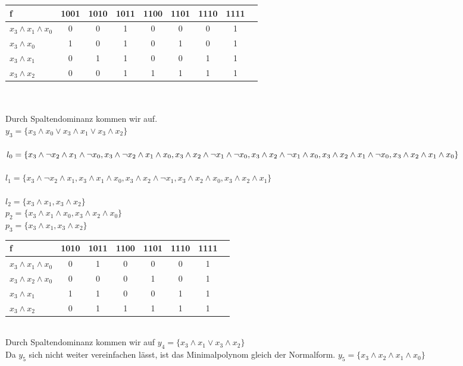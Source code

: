 \documentclass[11pt,a4paper]{article}
\begin{document}
\begin{tabular}{l  | c | c | c | c | c | c | c | c }
f&1001&1010&1011&1100&1101&1110&1111 \\ \hline
$x_3 \wedge x_1 \wedge x_0$&0&0&1&0&0&0&1\\
$x_3 \wedge x_0$&1&0&1&0&1&0&1\\
$x_3 \wedge x_1$&0&1&1&0&0&1&1\\
$x_3 \wedge x_2$&0&0&1&1&1&1&1\\
\end{tabular}\\ \\
Durch Spaltendominanz kommen wir auf.\\
$y_3=\lbrace x_3 \wedge x_0 \vee x_3 \wedge x_1 \vee x_3 \wedge x_2 \rbrace$\\ \\
$l_0= \lbrace \\
x_3 \wedge \neg x_2 \wedge x_1 \wedge \neg x_0, \\
x_3 \wedge \neg x_2 \wedge x_1 \wedge x_0, \\
x_3 \wedge x_2 \wedge \neg x_1 \wedge \neg x_0,\\
x_3 \wedge x_2 \wedge \neg x_1 \wedge x_0,\\
x_3 \wedge x_2 \wedge x_1 \wedge \neg x_0, \\
x_3 \wedge x_2 \wedge x_1 \wedge x_0 \rbrace$\\ \\
$l_1= \lbrace 
x_3 \wedge \neg x_2 \wedge x_1,
x_3 \wedge x_1 \wedge x_0,
x_3 \wedge x_2 \wedge \neg x_1,
x_3 \wedge x_2 \wedge x_0,
x_3 \wedge x_2 \wedge x_1 \rbrace$\\ \\
$l_2= \lbrace 
x_3 \wedge x_1,
x_3 \wedge x_2 \rbrace$\\ 
$p_2= \lbrace x_3 \wedge x_1 \wedge x_0,x_3 \wedge x_2 \wedge x_0 \rbrace$\\
$p_3= \lbrace 
x_3 \wedge x_1,
x_3 \wedge x_2 \rbrace$\\
\begin{tabular}{l   | c | c | c | c | c | c | c }
f&1010&1011&1100&1101&1110&1111 \\ \hline
$x_3 \wedge x_1 \wedge x_0$&0&1&0&0&0&1\\
$x_3 \wedge x_2 \wedge x_0$&0&0&0&1&0&1\\
$x_3 \wedge x_1$&1&1&0&0&1&1\\
$x_3 \wedge x_2$&0&1&1&1&1&1\\
\end{tabular}\\
Durch Spaltendominanz kommen wir auf  $y_4= \lbrace x_3 \wedge x_1 \vee x_3 \wedge x_2 \rbrace$\\ 
Da $y_5$ sich nicht weiter vereinfachen lässt, ist das Minimalpolynom gleich der Normalform. 
$y_5= \lbrace x_3 \wedge x_2 \wedge x_1 \wedge x_0 \rbrace $\\ \\
\end{document}
